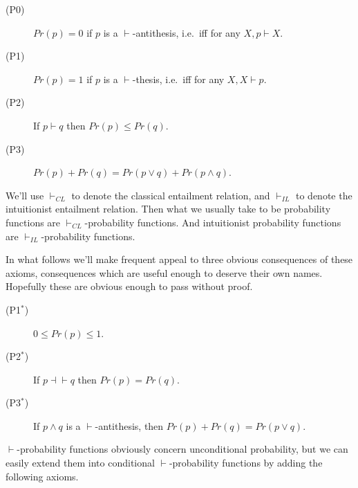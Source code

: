 \documentclass[
  11pt,
  letterpaper,
  DIV=11,
  numbers=noendperiod,
  oneside]{scrartcl}
\begin{document}
\begin{description}
\item[(P0)]
\(Pr(p) = 0\) if \(p\) is a \(\vdash\)-antithesis, i.e.~iff for any
\(X, p \vdash X\).
\item[(P1)]
\(Pr(p) = 1\) if \(p\) is a \(\vdash\)-thesis, i.e.~iff for any
\(X, X \vdash p\).
\item[(P2)]
If \(p \vdash q\) then \(Pr(p) \leq Pr(q)\).
\item[(P3)]
\(Pr(p) + Pr(q) = Pr(p \vee q) + Pr(p \wedge q)\).
\end{description}

We'll use \(\vdash_{CL}\) to denote the classical entailment relation,
and \(\vdash_{IL}\) to denote the intuitionist entailment relation. Then
what we usually take to be probability functions are
\(\vdash_{CL}\)-probability functions. And intuitionist probability
functions are \(\vdash_{IL}\)-probability functions.

In what follows we'll make frequent appeal to three obvious consequences
of these axioms, consequences which are useful enough to deserve their
own names. Hopefully these are obvious enough to pass without
proof.

\begin{description}
\item[(P1\(^*\))]
\(0 \leq Pr(p) \leq 1\).
\item[(P2\(^*\))]
If \(p \dashv \vdash q\) then \(Pr(p) = Pr(q)\).
\item[(P3\(^*\))]
If \(p \wedge q\) is a \(\vdash\)-antithesis, then
\(Pr(p) + Pr(q) = Pr(p \vee q)\).
\end{description}

\(\vdash\)-probability functions obviously concern unconditional
probability, but we can easily extend them into conditional
\(\vdash\)-probability functions by adding the following
axioms.
\end{document}
